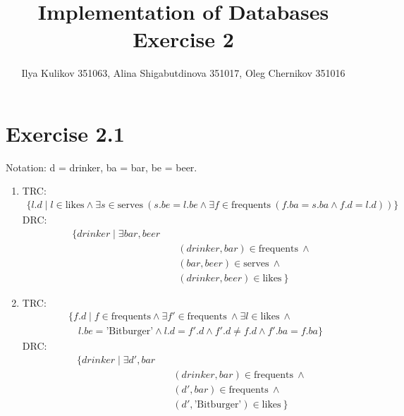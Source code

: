 \documentclass[10pt]{article}
\title{Implementation of Databases Exercise 2}
\author{Ilya Kulikov 351063, Alina Shigabutdinova 351017, Oleg Chernikov 351016}
\begin{document}
  \maketitle
  \section*{Exercise 2.1}
  	Notation: d = drinker, ba = bar, be = beer.
  \begin{enumerate}[label=\arabic*.]
      \item
      TRC:
      \begin{equation*}
      \begin{split}
        \{l.d \mid l \in \text{likes} \wedge \exists s \in \text{serves}\ (s.be = l.be \wedge \exists f \in \text{frequents}\ (f.ba = s.ba \wedge f.d = l.d))\}
      \end{split}
      \end{equation*}
      DRC:
      \begin{equation*}
      \begin{split}
      	\{drinker \mid \exists bar, beer \\
        &\quad (drinker, bar) \in \text{frequents}\ \wedge\\
        &\quad (bar, beer) \in \text{serves}\ \wedge\\
		&\quad (drinker, beer) \in \text{likes}\ \}
      \end{split}
      \end{equation*}
      
      \item
      TRC:
      \begin{equation*}
      \begin{split}
        &\{f.d \mid f \in \text{frequents} \wedge \exists f' \in \text{frequents}\ \wedge \exists l \in \text{likes}\ \wedge \\
        &\quad l.be = \text{'Bitburger'} \wedge l.d = f'.d \wedge f'.d \neq f.d \wedge f'.ba = f.ba\}
      \end{split}
      \end{equation*}
      DRC:
      \begin{equation*}
      \begin{split}
      	\{drinker \mid \exists d',bar \\
        &\quad (drinker, bar) \in \text{frequents}\ \wedge\\
        &\quad (d', bar) \in \text{frequents}\ \wedge\\
		&\quad (d', \text{'Bitburger'}) \in \text{likes}\ \}
      \end{split}
      \end{equation*}
      

\end{enumerate}
\end{document}
